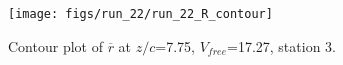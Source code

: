 \begin{figure}[H]
\centering
\texttt{[image: figs/run\_22/run\_22\_R\_contour]}
\caption{Contour plot of $\overline{r}$ at $z/c$=7.75, $V_{free}$=17.27, station 3.}
\label{fig:run_22_R_contour}
\end{figure}


